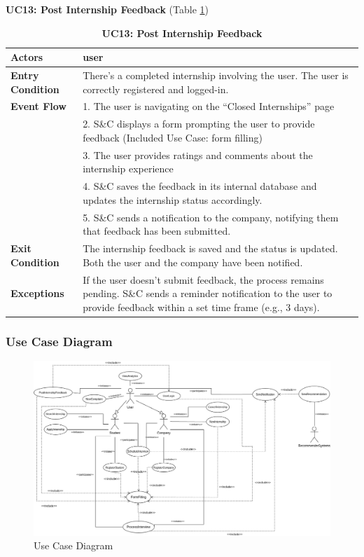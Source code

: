 \textbf{UC13: Post Internship Feedback }(Table \ref{tab:UC13})
\begin{table}[H]
\centering
\caption{\textbf{UC13: Post Internship Feedback}}
\label{tab:UC13}
\begin{tabularx}{\textwidth}{|X|X|}
\hline
\textbf{Actors}           & user                                                       \\ \hline
\textbf{Entry Condition}   & There’s a completed internship involving the user. The user is correctly registered and logged-in. \\ \hline
\textbf{Event Flow}        & 1. The user is navigating on the ``Closed Internships'' page \\
                           & 2. S\&C displays a form prompting the user to provide feedback (Included Use Case: form filling) \\
                           & 3. The user provides ratings and comments about the internship experience \\
                           & 4. S\&C saves the feedback in its internal database and updates the internship status accordingly. \\
                           & 5. S\&C sends a notification to the company, notifying them that feedback has been submitted. \\ \hline
\textbf{Exit Condition}    & The internship feedback is saved and the status is updated. Both the user and the company have been notified. \\ \hline
\textbf{Exceptions}        & If the user doesn’t submit feedback, the process remains pending. S\&C sends a reminder notification to the user to provide feedback within a set time frame (e.g., 3 days). \\ \hline
\end{tabularx}
\end{table}

\clearpage
\subsubsection{Use Case Diagram}

\begin{figure}[H]
\centering
\includegraphics[width=\textwidth]{Images/use_case_diagram.png}
\caption{\label{fig:use-case-diagram} Use Case Diagram}
\end{figure}


